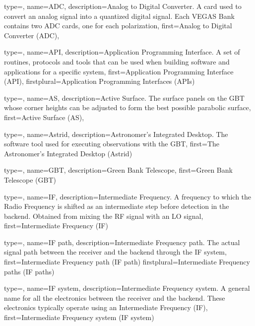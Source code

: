 
{
  type=\acronymtype,
  name={ADC},
  description={Analog to Digital Converter. A card used to convert an analog signal into a
  quantized digital signal.  Each \gls{VEGAS} Bank contains two ADC
  cards, one for each polarization},
  first={Analog to Digital Converter (ADC)},
} 

{
  type=\acronymtype,
  name={API},
  description={Application Programming Interface. A set of routines, protocols
  and tools that can be used when building software and applications for a
  specific system},
  first={Application Programming Interface (API)},
  firstplural={Application Programming Interfaces (APIs)}
} 

{
  type=\acronymtype,
  name={AS},
  description={Active Surface. The surface panels on the GBT whose corner heights can be 
               adjusted to form the best possible parabolic surface},
  first={Active Surface (AS)},
} 

{
  type=\acronymtype,
  name={Astrid},
  description={Astronomer's Integrated Desktop. The software tool used for executing
observations with the GBT},
  first={The Astronomer's Integrated Desktop (Astrid)}
} 

{
  type=\acronymtype,
  name={GBT},
  description={Green Bank Telescope},
  first={Green Bank Telescope (GBT)}
} 

{
  type=\acronymtype,
  name={IF},
  description={Intermediate Frequency.
A frequency to which the Radio Frequency is shifted as an 
intermediate step before detection in the backend.  Obtained from mixing the 
RF signal with an LO signal},
  first={Intermediate Frequency (IF)}
} 

{
  type=\acronymtype,
  name={IF path},
  description={Intermediate Frequency path.
The actual signal path between the receiver and the backend
through the IF system},
  first={Intermediate Frequency path (IF path)}
  firstplural={Intermediate Frequency paths (IF paths)}
} 

{
  type=\acronymtype,
  name={IF system},
  description={Intermediate Frequency system.
A general name for all the electronics between the receiver
and the backend.  These electronics typically operate using an Intermediate
Frequency (IF)},
  first={Intermediate Frequency system (IF system)}
} 

